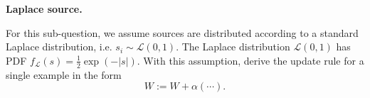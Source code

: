 \item {} \textbf{Laplace source.}

For this sub-question, we assume sources are distributed according to a standard Laplace distribution, i.e. $s_i \sim \mathcal{L}(0,1)$.
The Laplace distribution $\mathcal{L}(0,1)$ has PDF $f_{\mathcal{L}}(s) = \frac{1}{2}\exp\left(-|s|\right)$.
With this assumption, derive the update rule for a single example in the form
$$ W := W + \alpha \left(\cdots\right).$$